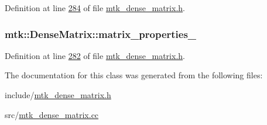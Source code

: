 Definition at line \hyperlink{mtk__dense__matrix_8h_source_l00284}{284} of file \hyperlink{mtk__dense__matrix_8h_source}{mtk\+\_\+dense\+\_\+matrix.\+h}.

\hypertarget{classmtk_1_1DenseMatrix_a481c8d09af685a5ba67acefdcaa810cc}{
\subsubsection[{matrix\+\_\+properties\+\_\+}]{ mtk\+::\+Dense\+Matrix\+::matrix\+\_\+properties\+\_\+\hspace{0.3cm}{\ttfamily [private]}}}\label{classmtk_1_1DenseMatrix_a481c8d09af685a5ba67acefdcaa810cc}


Definition at line \hyperlink{mtk__dense__matrix_8h_source_l00282}{282} of file \hyperlink{mtk__dense__matrix_8h_source}{mtk\+\_\+dense\+\_\+matrix.\+h}.



The documentation for this class was generated from the following files\+:\begin{DoxyCompactItemize}
\item 
include/\hyperlink{mtk__dense__matrix_8h}{mtk\+\_\+dense\+\_\+matrix.\+h}\item 
src/\hyperlink{mtk__dense__matrix_8cc}{mtk\+\_\+dense\+\_\+matrix.\+cc}\end{DoxyCompactItemize}

